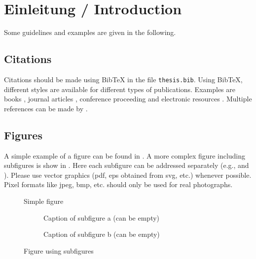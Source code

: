 \chapter{Einleitung / Introduction}

Some guidelines and examples are given in the following.

\section{Citations}

Citations should be made using BibTeX in the file \verb|thesis.bib|.
Using BibTeX, different styles are available for different types of publications. Examples are books \cite{Adams90}, journal articles \cite{Zhang99}, conference proceeding \cite{Yee99} and
electronic resources \cite{Fear05}. Multiple references can be made by \cite{Adams90,Zhang99,Yee99,Fear05}.


\section{Figures}

A simple example of a figure can be found in . A more complex figure including subfigures is show in . Here each subfigure can be addressed separately (e.g.,  and ). Please use vector graphics (pdf, eps obtained from svg, etc.) whenever possible. Pixel formats like jpeg, bmp, etc. should only be used for real photographs.

\begin{figure}[!h]
	\centering
	\fbox{\parbox{5cm}{\centering ~\vspace{1.5cm}\\Dummy\\~\vspace{1.5cm}}} %
	\caption{Simple figure}
	\label{fig:simple_figure}
\end{figure}

\begin{figure}[!h]
	\centering
	\begin{subfigure}[b]{7cm}
		\centering
		\fbox{\parbox{5cm}{\centering ~\vspace{1.5cm}\\Dummy\\~\vspace{1.5cm}}} %
		\caption{Caption of subfigure a (can be empty)}
		\label{fig:subfigure1}
	\end{subfigure}
	\begin{subfigure}[b]{7cm}
		\centering
		\fbox{\parbox{5cm}{\centering ~\vspace{1.5cm}\\Dummy\\~\vspace{1.5cm}}} %
		\caption{Caption of subfigure b (can be empty)}
		\label{fig:subfigure2}
	\end{subfigure}
	\caption{Figure using subfigures}
	\label{fig:figure_with_subfigures}
\end{figure}


